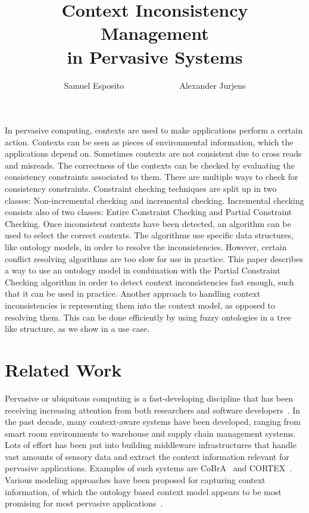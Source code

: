 \documentclass[journal]{vgtc}                %
\title{Context Inconsistency Management \\in Pervasive Systems}
\author{Samuel Esposito ~~~~~~~~~~~~ Alexander Jurjens}
\begin{document}


\maketitle

In pervasive computing, contexts are used to make applications perform a certain action. Contexts can be seen as pieces of environmental information, which the applications depend on. Sometimes contexts are not consistent due to cross reads and misreads. The correctness of the contexts can be checked by evaluating the consistency constraints associated to them. There are multiple ways to check for consistency constraints. Constraint checking techniques are split up in two classes: Non-incremental checking and incremental checking. Incremental checking consists also of two classes: Entire Constraint Checking and Partial Constraint Checking. Once inconsistent contexts have been detected, an algorithm can be used to select the correct contexts. The algorithms use specific data structures, like ontology models, in order to resolve the inconsistencies. However, certain conflict resolving algorithms are too slow for use in practice. This paper describes a way to use an ontology model in combination with the Partial Constraint Checking algorithm in order to detect context inconsistencies fast enough, such that it can be used in practice. Another approach to handling context inconsistencies is representing them into the context model, as opposed to resolving them. This can be done efficiently by using fuzzy ontologies in a tree like structure, as we show in a use case.

\section{Related Work}
Pervasive or ubiquitous computing is a fast-developing discipline that has been receiving increasing attention from both researchers and software developers~\cite{xu:2010:PCC}. In the past decade, many context-aware systems have been developed, ranging from smart room environments to warehouse and supply chain management systems. Lots of effort has been put into building middleware infrastructures that handle vast amounts of sensory data and extract the context information relevant for pervasive applications. Examples of such systems are CoBrA~\cite{1276865} and CORTEX~\cite{1276875}. Various modeling approaches have been proposed for capturing context information, of which the ontology based context model appears to be most promising for most pervasive applications~\cite{bu:2006:CCM}.
\end{document}
